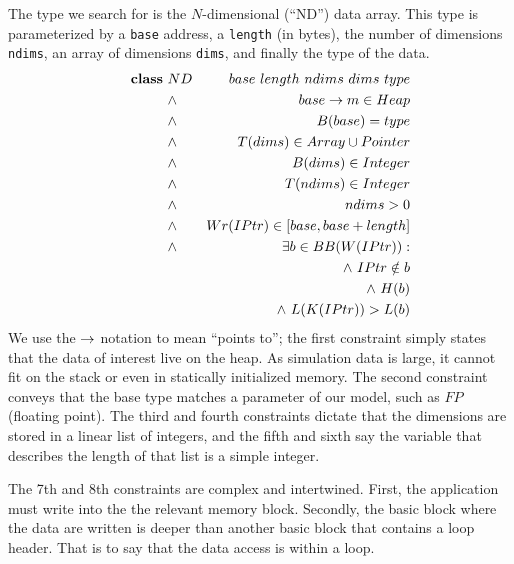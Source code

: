 

The type we search for is the $N$-dimensional (``ND'') data array.
This type is parameterized by a \texttt{base} address, a
\texttt{length} (in bytes), the number of
dimensions \texttt{ndims}, an array of dimensions \texttt{dims}, and
finally the type of the data.
\begin{eqnarray}
  \indent \textbf{class} \ & ND & \  base \  length \  ndims \  dims \  type
    \nonumber\\
  \indent &\land& base \pointsto m \in Heap\\
  \indent &\land& B(base) = type\\
  \indent &\land& T(dims) \in Array \union Pointer\\
  \indent &\land& B(dims) \in Integer\\
  \indent &\land& T(ndims) \in Integer\\
  \indent &\land& ndims > 0\\
  \indent &\land& Wr(IPtr) \in [ base, base + length ]\\
  \indent &\land& \exists b \in BB(W(IPtr)) : \nonumber\\
    && \land \ IPtr \notin b \nonumber \\
    && \land \ H(b) \nonumber\\
    && \land \ L(K(IPtr)) > L(b)
\end{eqnarray}
We use the $\rightarrow$ notation to mean ``points to''; the first
constraint simply states that the data of interest live on the heap.
As simulation data is large, it cannot fit on the stack or even in
statically initialized memory.  The second constraint conveys that the base
type matches a parameter of our model, such as $FP$ (floating point).
The third and fourth constraints dictate that the dimensions are stored
in a linear list of integers, and the fifth and sixth say the variable
that describes the length of that list is a simple integer.

The 7th and 8th constraints are complex and intertwined.  First, the
application must write into the the relevant memory block.  Secondly,
the basic block where the data are written is deeper than another basic
block that contains a loop header.  That is to say that the data access
is within a loop.

